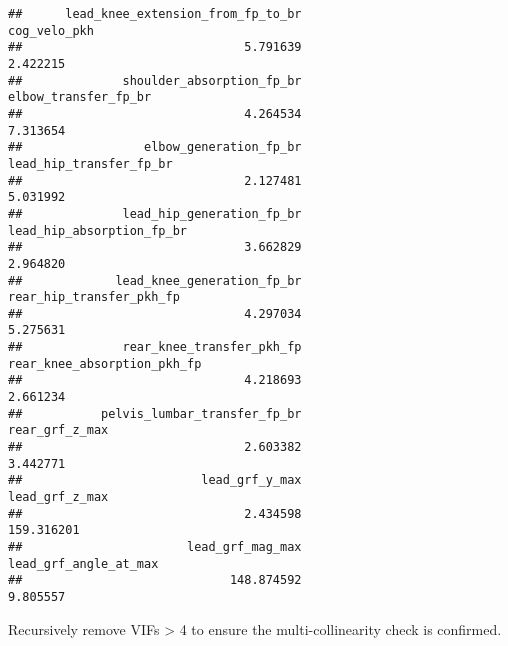 \documentclass[
]{article}
\begin{document}
\begin{verbatim}
##      lead_knee_extension_from_fp_to_br                           cog_velo_pkh 
##                               5.791639                               2.422215 
##              shoulder_absorption_fp_br                   elbow_transfer_fp_br 
##                               4.264534                               7.313654 
##                 elbow_generation_fp_br                lead_hip_transfer_fp_br 
##                               2.127481                               5.031992 
##              lead_hip_generation_fp_br              lead_hip_absorption_fp_br 
##                               3.662829                               2.964820 
##             lead_knee_generation_fp_br               rear_hip_transfer_pkh_fp 
##                               4.297034                               5.275631 
##              rear_knee_transfer_pkh_fp            rear_knee_absorption_pkh_fp 
##                               4.218693                               2.661234 
##           pelvis_lumbar_transfer_fp_br                         rear_grf_z_max 
##                               2.603382                               3.442771 
##                         lead_grf_y_max                         lead_grf_z_max 
##                               2.434598                             159.316201 
##                       lead_grf_mag_max                  lead_grf_angle_at_max 
##                             148.874592                               9.805557
\end{verbatim}

Recursively remove VIFs \textgreater{} 4 to ensure the
multi-collinearity check is confirmed.
\end{document}
